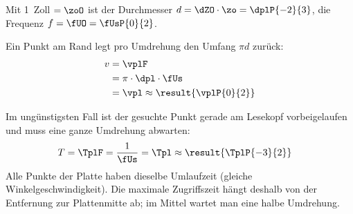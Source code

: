 Mit 1~Zoll $= \zoO$ ist der Durchmesser $d = \dZO\cdot\zo = \dplP{-2}{3}$, die Frequenz $f = \fUO = \fUsP{0}{2}$.
\begin{abcliste}
\abc Ein Punkt am Rand legt pro Umdrehung den Umfang $\pi d$ zurück:
\begin{align}
 v &= \vplF \\
   &= \pi\cdot\dpl\cdot\fUs \\
   &= \vpl \approx \result{\vplP{0}{2}}
\end{align}

\abc Im ungünstigsten Fall ist der gesuchte Punkt gerade am Lesekopf vorbeigelaufen und muss eine ganze Umdrehung abwarten:
\begin{align}
 T &= \TplF = \frac{1}{\fUs} = \Tpl \approx \result{\TplP{-3}{2}}
\end{align}
Alle Punkte der Platte haben dieselbe Umlaufzeit (gleiche Winkelgeschwindigkeit). Die maximale Zugriffszeit hängt deshalb  von der Entfernung zur Plattenmitte ab; im Mittel wartet man eine halbe Umdrehung.
\end{abcliste}
